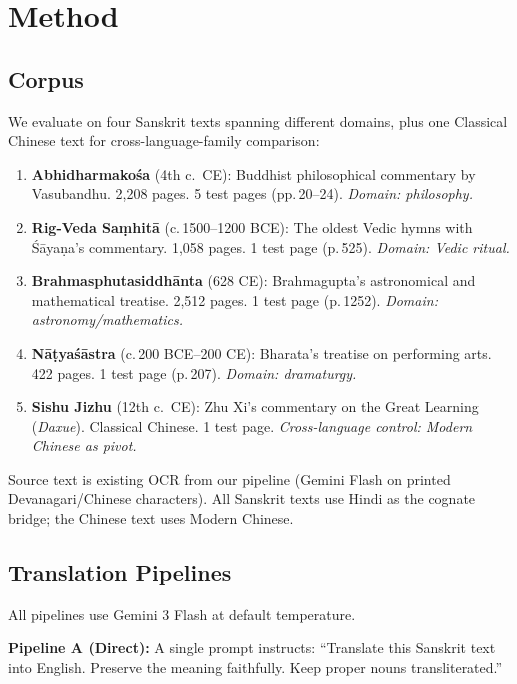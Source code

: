 \documentclass[10pt,twocolumn]{article}
\begin{document}
\section{Method}

\subsection{Corpus}

We evaluate on four Sanskrit texts spanning different domains, plus one Classical Chinese text for cross-language-family comparison:

\begin{enumerate}
\item \textbf{Abhidharmako\'sa} (4th c.\ CE): Buddhist philosophical commentary by Vasubandhu. 2,208 pages. 5 test pages (pp.\,20--24). \emph{Domain: philosophy.}
\item \textbf{Rig-Veda Sa\d{m}hit\=a} (c.\,1500--1200 BCE): The oldest Vedic hymns with \'S\=aya\d{n}a's commentary. 1,058 pages. 1 test page (p.\,525). \emph{Domain: Vedic ritual.}
\item \textbf{Brahmasphutasiddh\=anta} (628 CE): Brahmagupta's astronomical and mathematical treatise. 2,512 pages. 1 test page (p.\,1252). \emph{Domain: astronomy/mathematics.}
\item \textbf{N\=a\d{t}ya\'s\=astra} (c.\,200 BCE--200 CE): Bharata's treatise on performing arts. 422 pages. 1 test page (p.\,207). \emph{Domain: dramaturgy.}
\item \textbf{Sishu Jizhu} (12th c.\ CE): Zhu Xi's commentary on the Great Learning (\emph{Daxue}). Classical Chinese. 1 test page. \emph{Cross-language control: Modern Chinese as pivot.}
\end{enumerate}

Source text is existing OCR from our pipeline (Gemini Flash on printed Devanagari/Chinese characters). All Sanskrit texts use Hindi as the cognate bridge; the Chinese text uses Modern Chinese.

\subsection{Translation Pipelines}

All pipelines use Gemini 3 Flash at default temperature.

\textbf{Pipeline A (Direct):} A single prompt instructs: ``Translate this Sanskrit text into English. Preserve the meaning faithfully. Keep proper nouns transliterated.''
\end{document}
